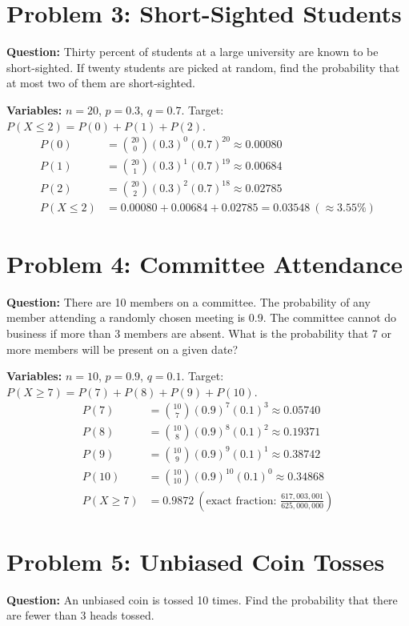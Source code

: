 \documentclass[11pt,a4paper]{article}
\begin{document}
\section*{Problem 3: Short-Sighted Students}
\textbf{Question:} Thirty percent of students at a large university are known to be short-sighted. If twenty students are picked at random, find the probability that at most two of them are short-sighted.

\noindent\textbf{Variables:} $n = 20$, $p = 0.3$, $q = 0.7$. Target: $P(X \le 2) = P(0) + P(1) + P(2)$.
\begin{align*}
    P(0) &= \binom{20}{0}(0.3)^0(0.7)^{20} \approx 0.00080 \\
    P(1) &= \binom{20}{1}(0.3)^1(0.7)^{19} \approx 0.00684 \\
    P(2) &= \binom{20}{2}(0.3)^2(0.7)^{18} \approx 0.02785 \\
    P(X \le 2) &= 0.00080 + 0.00684 + 0.02785 = \mathbf{0.03548} \ (\approx 3.55\%)
\end{align*}

\section*{Problem 4: Committee Attendance}
\textbf{Question:} There are 10 members on a committee. The probability of any member attending a randomly chosen meeting is 0.9. The committee cannot do business if more than 3 members are absent. What is the probability that 7 or more members will be present on a given date?

\noindent\textbf{Variables:} $n = 10$, $p = 0.9$, $q = 0.1$. Target: $P(X \ge 7) = P(7) + P(8) + P(9) + P(10)$.
\begin{align*}
    P(7) &= \binom{10}{7}(0.9)^7(0.1)^3 \approx 0.05740 \\
    P(8) &= \binom{10}{8}(0.9)^8(0.1)^2 \approx 0.19371 \\
    P(9) &= \binom{10}{9}(0.9)^9(0.1)^1 \approx 0.38742 \\
    P(10) &= \binom{10}{10}(0.9)^{10}(0.1)^0 \approx 0.34868 \\
    P(X \ge 7) &= \mathbf{0.9872} \ (\text{exact fraction: } \frac{617,003,001}{625,000,000})
\end{align*}

\section*{Problem 5: Unbiased Coin Tosses}
\textbf{Question:} An unbiased coin is tossed 10 times. Find the probability that there are fewer than 3 heads tossed.
\end{document}
